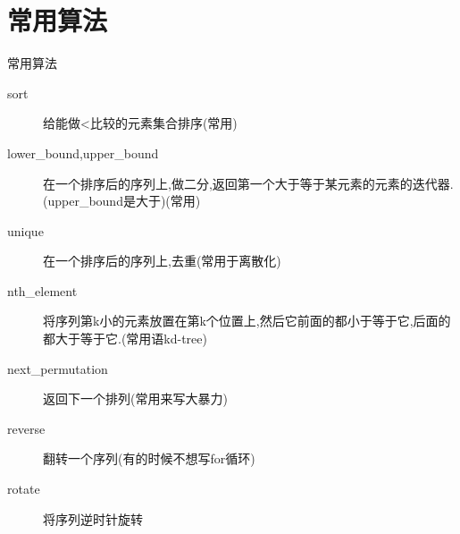 \documentclass[11pt,serif]{beamer}
\begin{document}
	\section{常用算法}
	\begin{frame}{常用算法}
		\begin{description}
			\item[sort] 给能做<比较的元素集合排序(常用)
			\item[lower\_bound,upper\_bound] 在一个排序后的序列上,做二分,返回第一个大于等于某元素的元素的迭代器.(upper\_bound是大于)(常用)
			\item[unique] 在一个排序后的序列上,去重(常用于离散化)
			\item[nth\_element] 将序列第k小的元素放置在第k个位置上,然后它前面的都小于等于它,后面的都大于等于它.(常用语kd-tree)
			\item[next\_permutation] 返回下一个排列(常用来写大暴力)
			\item[reverse] 翻转一个序列(有的时候不想写for循环)
			\item[rotate] 将序列逆时针旋转
		\end{description}
	\end{frame} 
\end{document}
